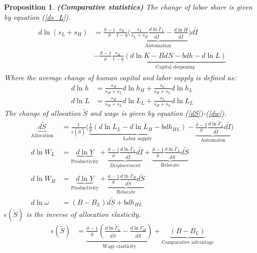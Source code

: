 \documentclass[12pt]{article}
\newtheorem{proposition}{Proposition}
\begin{document}
\begin{proposition}{\bf (Comparative statistics)}
The change of labor share is given by equation (\ref{ds_L}). 
\begin{align}
\label{ds_L}
\begin{split}
d\ln(s_{L}+s_{H}) &= \frac{\hat{\sigma}-1}{\hat{\sigma}}\frac{s_K}{1-\eta}\underbrace{( \frac{s_L}{s_L+s_H}\frac{d\ln\tilde{\Gamma}_L}{d\tilde{I}}-\frac{d\ln H}{d\tilde{I}}}_{\text{Automation}})d\tilde{I}\\
&-\frac{\hat{\sigma}-1}{\hat{\sigma}}\frac{s_K}{1-\eta}\underbrace{(d\ln K -BdN-bdh-d\ln L)}_{\text{Capital deepening}}
 \end{split}
\end{align}
Where the average change of human capital and labor supply is defined as: 
\begin{align*}
d\ln h &= \frac{s_H}{s_H+s_L}d\ln h_H+\frac{s_L}{s_H+s_L}d\ln h_L\\
d\ln L &= \frac{s_H}{s_H+s_L}d\ln L_L+\frac{s_L}{s_H+s_L}d\ln L_L
\end{align*}
The change of allocation $\tilde{S}$ and wage is given by equation (\ref{dS})-(\ref{dw}). 
\begin{align}
\label{dS}
\underbrace{d\tilde{S}}_{\text{Allocation}} &= \frac{1}{\epsilon(\tilde{S})}\Big(\underbrace{\frac{1}{\hat{\sigma}}(d\ln L_L-d\ln L_H-bdh_{HL})}_{\text{Labor supply}}-\underbrace{\frac{\hat{\sigma}-1}{\hat{\sigma}}\frac{d\ln\tilde{\Gamma}_L}{d\tilde{I}}d\tilde{I}}_{\text{Automaton}}\Big) \\ 
\label{dW_L}
d \ln W_L &= \underbrace{d \ln Y}_{\text{Productivity}} + \underbrace{\frac{\hat{\sigma}-1}{\hat{\sigma}}\frac{d\ln\tilde{\Gamma}_L}{d\tilde{I}}d\tilde{I}}_{Displacement}+ \underbrace{\frac{\hat{\sigma}-1}{\hat{\sigma}}\frac{d\ln\tilde{\Gamma}_L}{d\tilde{S}}d\tilde{S}}_{\text{Relocate}}\\
\label{dW_H}
d \ln W_H &= \underbrace{d \ln Y}_{\text{Productivity}}  + \underbrace{\frac{\hat{\sigma}-1}{\hat{\sigma}}\frac{d\ln\tilde{\Gamma}_H}{d\tilde{S}}d\tilde{S}}_{\text{Relocate}} \\
\label{dw}
d \ln \omega &=(B-B_L)d\tilde{S}+bdh_{HL}
\end{align}
$\epsilon(\tilde{S})$ is the inverse of allocation elasticity. 
\begin{align}
\label{eS}
\epsilon(\tilde{S})&= \underbrace{\frac{\hat{\sigma}-1}{\hat{\sigma}}(\frac{d\ln \tilde{\Gamma}_L}{d\tilde{S}}-\frac{d\ln \tilde{\Gamma}_H}{d\tilde{S}})}_{\text{Wage elasticity}}
								 +\underbrace{(B-B_L)}_{\text{Comparative advantage}}
\end{align}
\end{proposition}
\end{document}
